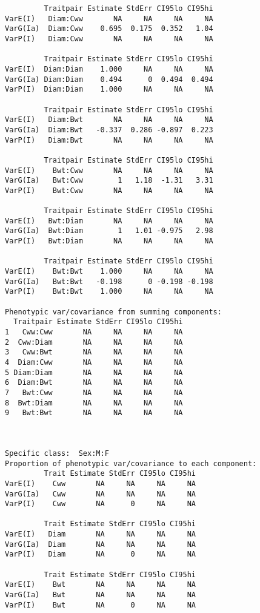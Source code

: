 \documentclass[titlepage]{article}  %
\begin{document}
\begin{verbatim}
         Traitpair Estimate StdErr CI95lo CI95hi
VarE(I)   Diam:Cww       NA     NA     NA     NA
VarG(Ia)  Diam:Cww    0.695  0.175  0.352   1.04
VarP(I)   Diam:Cww       NA     NA     NA     NA

         Traitpair Estimate StdErr CI95lo CI95hi
VarE(I)  Diam:Diam    1.000     NA     NA     NA
VarG(Ia) Diam:Diam    0.494      0  0.494  0.494
VarP(I)  Diam:Diam    1.000     NA     NA     NA

         Traitpair Estimate StdErr CI95lo CI95hi
VarE(I)   Diam:Bwt       NA     NA     NA     NA
VarG(Ia)  Diam:Bwt   -0.337  0.286 -0.897  0.223
VarP(I)   Diam:Bwt       NA     NA     NA     NA

         Traitpair Estimate StdErr CI95lo CI95hi
VarE(I)    Bwt:Cww       NA     NA     NA     NA
VarG(Ia)   Bwt:Cww        1   1.18  -1.31   3.31
VarP(I)    Bwt:Cww       NA     NA     NA     NA

         Traitpair Estimate StdErr CI95lo CI95hi
VarE(I)   Bwt:Diam       NA     NA     NA     NA
VarG(Ia)  Bwt:Diam        1   1.01 -0.975   2.98
VarP(I)   Bwt:Diam       NA     NA     NA     NA

         Traitpair Estimate StdErr CI95lo CI95hi
VarE(I)    Bwt:Bwt    1.000     NA     NA     NA
VarG(Ia)   Bwt:Bwt   -0.198      0 -0.198 -0.198
VarP(I)    Bwt:Bwt    1.000     NA     NA     NA

Phenotypic var/covariance from summing components:
  Traitpair Estimate StdErr CI95lo CI95hi
1   Cww:Cww       NA     NA     NA     NA
2  Cww:Diam       NA     NA     NA     NA
3   Cww:Bwt       NA     NA     NA     NA
4  Diam:Cww       NA     NA     NA     NA
5 Diam:Diam       NA     NA     NA     NA
6  Diam:Bwt       NA     NA     NA     NA
7   Bwt:Cww       NA     NA     NA     NA
8  Bwt:Diam       NA     NA     NA     NA
9   Bwt:Bwt       NA     NA     NA     NA



Specific class:  Sex:M:F 
Proportion of phenotypic var/covariance to each component:
         Trait Estimate StdErr CI95lo CI95hi
VarE(I)    Cww       NA     NA     NA     NA
VarG(Ia)   Cww       NA     NA     NA     NA
VarP(I)    Cww       NA      0     NA     NA

         Trait Estimate StdErr CI95lo CI95hi
VarE(I)   Diam       NA     NA     NA     NA
VarG(Ia)  Diam       NA     NA     NA     NA
VarP(I)   Diam       NA      0     NA     NA

         Trait Estimate StdErr CI95lo CI95hi
VarE(I)    Bwt       NA     NA     NA     NA
VarG(Ia)   Bwt       NA     NA     NA     NA
VarP(I)    Bwt       NA      0     NA     NA


\end{verbatim}
\end{document}
